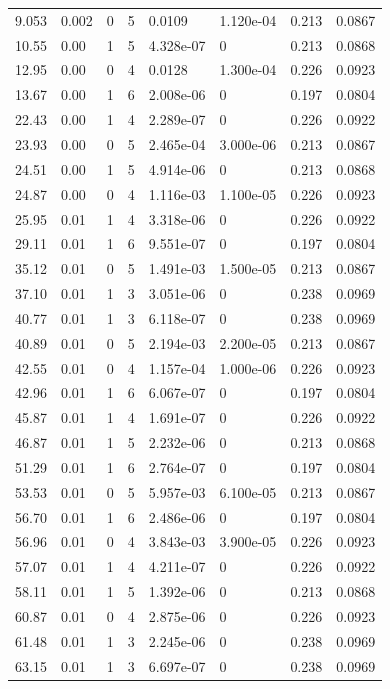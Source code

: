 \documentclass[preview]{standalone}
\begin{document}
{{\begin{tabular}{L{1.2cm}C{1.2cm} C{0.3cm}C{0.5cm} C{1.4cm}C{1.4cm} C{1.4cm}C{1.4cm}}
  9.053  &  0.002  & 0     &  5 &  0.0109  & 1.120e-04  & 0.213 &  0.0867   \\ 
  10.55  &  0.00  & 1     &  5 &  4.328e-07  & 0  & 0.213 &  0.0868   \\ 
  12.95  &  0.00  & 0     &  4 &  0.0128  & 1.300e-04  & 0.226 &  0.0923   \\ 
  13.67  &  0.00  & 1     &  6 &  2.008e-06  & 0  & 0.197 &  0.0804   \\ 
  22.43  &  0.00  & 1     &  4 &  2.289e-07  & 0  & 0.226 &  0.0922   \\ 
  23.93  &  0.00  & 0     &  5 &  2.465e-04  & 3.000e-06  & 0.213 &  0.0867   \\ 
  24.51  &  0.00  & 1     &  5 &  4.914e-06  & 0  & 0.213 &  0.0868   \\ 
  24.87  &  0.00  & 0     &  4 &  1.116e-03  & 1.100e-05  & 0.226 &  0.0923   \\ 
  25.95  &  0.01  & 1     &  4 &  3.318e-06  & 0  & 0.226 &  0.0922   \\ 
  29.11  &  0.01  & 1     &  6 &  9.551e-07  & 0  & 0.197 &  0.0804   \\ 
  35.12  &  0.01  & 0     &  5 &  1.491e-03  & 1.500e-05  & 0.213 &  0.0867   \\ 
  37.10  &  0.01  & 1     &  3 &  3.051e-06  & 0  & 0.238 &  0.0969   \\ 
  40.77  &  0.01  & 1     &  3 &  6.118e-07  & 0  & 0.238 &  0.0969   \\ 
  40.89  &  0.01  & 0     &  5 &  2.194e-03  & 2.200e-05  & 0.213 &  0.0867   \\ 
  42.55  &  0.01  & 0     &  4 &  1.157e-04  & 1.000e-06  & 0.226 &  0.0923   \\ 
  42.96  &  0.01  & 1     &  6 &  6.067e-07  & 0  & 0.197 &  0.0804   \\ 
  45.87  &  0.01  & 1     &  4 &  1.691e-07  & 0  & 0.226 &  0.0922   \\ 
  46.87  &  0.01  & 1     &  5 &  2.232e-06  & 0  & 0.213 &  0.0868   \\ 
  51.29  &  0.01  & 1     &  6 &  2.764e-07  & 0  & 0.197 &  0.0804   \\ 
  53.53  &  0.01  & 0     &  5 &  5.957e-03  & 6.100e-05  & 0.213 &  0.0867   \\ 
  56.70  &  0.01  & 1     &  6 &  2.486e-06  & 0  & 0.197 &  0.0804   \\ 
  56.96  &  0.01  & 0     &  4 &  3.843e-03  & 3.900e-05  & 0.226 &  0.0923   \\ 
  57.07  &  0.01  & 1     &  4 &  4.211e-07  & 0  & 0.226 &  0.0922   \\ 
  58.11  &  0.01  & 1     &  5 &  1.392e-06  & 0  & 0.213 &  0.0868   \\ 
  60.87  &  0.01  & 0     &  4 &  2.875e-06  & 0  & 0.226 &  0.0923   \\ 
  61.48  &  0.01  & 1     &  3 &  2.245e-06  & 0  & 0.238 &  0.0969   \\ 
  63.15  &  0.01  & 1     &  3 &  6.697e-07  & 0  & 0.238 &  0.0969   \\ 
\hline 
\end{tabular} 

}}
\end{document}
